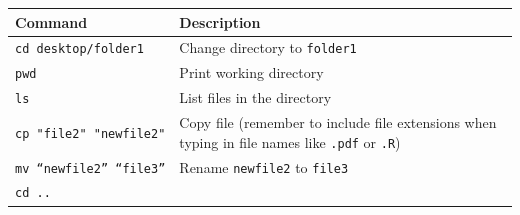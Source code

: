 \documentclass[]{book}
\begin{document}
\begin{longtable}[]{@{}ll@{}}
\toprule
\begin{minipage}[b]{0.41\columnwidth}\raggedright
Command\strut
\end{minipage} & \begin{minipage}[b]{0.53\columnwidth}\raggedright
Description\strut
\end{minipage}\tabularnewline
\midrule
\endhead
\begin{minipage}[t]{0.41\columnwidth}\raggedright
\texttt{cd\ desktop/folder1}\strut
\end{minipage} & \begin{minipage}[t]{0.53\columnwidth}\raggedright
Change directory to \texttt{folder1}\strut
\end{minipage}\tabularnewline
\begin{minipage}[t]{0.41\columnwidth}\raggedright
\texttt{pwd}\strut
\end{minipage} & \begin{minipage}[t]{0.53\columnwidth}\raggedright
Print working directory\strut
\end{minipage}\tabularnewline
\begin{minipage}[t]{0.41\columnwidth}\raggedright
\texttt{ls}\strut
\end{minipage} & \begin{minipage}[t]{0.53\columnwidth}\raggedright
List files in the directory\strut
\end{minipage}\tabularnewline
\begin{minipage}[t]{0.41\columnwidth}\raggedright
\texttt{cp\ "file2"\ "newfile2"}\strut
\end{minipage} & \begin{minipage}[t]{0.53\columnwidth}\raggedright
Copy file (remember to include file extensions when typing in file names like \texttt{.pdf} or \texttt{.R})\strut
\end{minipage}\tabularnewline
\begin{minipage}[t]{0.41\columnwidth}\raggedright
\texttt{mv\ “newfile2”\ “file3”}\strut
\end{minipage} & \begin{minipage}[t]{0.53\columnwidth}\raggedright
Rename \texttt{newfile2} to \texttt{file3}\strut
\end{minipage}\tabularnewline
\begin{minipage}[t]{0.41\columnwidth}\raggedright
\texttt{cd\ ..}\strut
\end{minipage} & \begin{minipage}[t]{0.53\columnwidth}\raggedright

\end{minipage}
\end{longtable}
\end{document}

